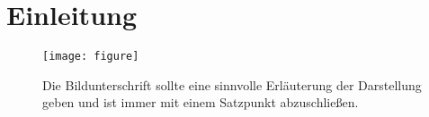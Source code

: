 %
\chapter{Einleitung}
%

\begin{figure}[!h] %
  \centering
  \texttt{[image: figure]}
  \caption{Die Bildunterschrift sollte eine sinnvolle Erläuterung der
    Darstellung geben und ist immer mit einem Satzpunkt abzuschließen.}
  \label{fig:abbildung1}
\end{figure}

